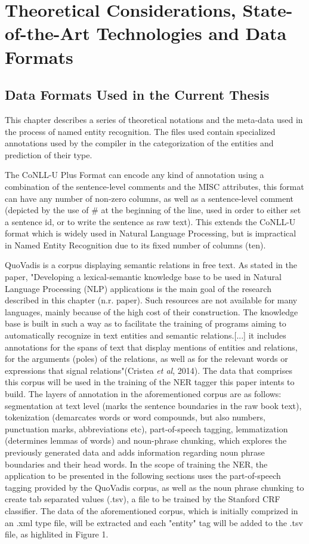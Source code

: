 \documentclass[12pt,a4paper]{article}
\begin{document}
\section{Theoretical Considerations, State-of-the-Art Technologies and Data Formats}
\subsection{Data Formats Used in the Current Thesis}
\qquad \quad This chapter describes a series of theoretical notations and the meta-data used in the process of named entity recognition. The files used contain specialized annotations used by the compiler in the categorization of the entities and prediction of their type.

\qquad The CoNLL-U Plus Format can encode any kind of annotation using a combination of the sentence-level comments and the MISC attributes, this format can have any number of non-zero columns, as well as a sentence-level comment (depicted by the use of $\#$ at the beginning of the line, used in order to either set a sentence id, or to write the sentence as raw text). This extends the CoNLL-U format which is widely used in Natural Language Processing, but is impractical in Named Entity Recognition due to its fixed number of columns (ten).

\qquad QuoVadis is a corpus displaying semantic relations in free text. As stated in the paper, "Developing a lexical-semantic knowledge base to be used in Natural Language Processing (NLP) applications is the main goal of the research described in this chapter (n.r. paper). Such resources are not available for many languages, mainly because of the high cost of their construction. The knowledge base is built in such a way as to facilitate the training of programs aiming to automatically recognize in text entities and semantic relations.[...] it includes annotations for the spans of text that display mentions of entities and relations, for the arguments (poles) of the relations, as well as for the relevant words or expressions that signal relations"(Cristea \textit{et al}, 2014). The data that comprises this corpus will be used in the training of the NER tagger this paper intents to build. The layers of annotation in the aforementioned corpus are as follows: segmentation at text level (marks the sentence boundaries in the raw book text), tokenization (demarcates words or word compounds, but also numbers, punctuation marks, abbreviations etc), part-of-speech tagging, lemmatization (determines lemmas of words) and noun-phrase chunking, which explores the previously generated data and adds information regarding noun phrase boundaries and their head words. In the scope of training the NER, the application to be presented in the following sections uses the part-of-speech tagging provided by the QuoVadis corpus, as well as the noun phrase chunking to create tab separated values (.tsv), a file to be trained by the Stanford CRF classifier. The data of the aforementioned corpus, which is initially comprized in an .xml type file, will be extracted and each "entity" tag will be added to the .tsv file, as highlited in Figure 1.
\end{document}

